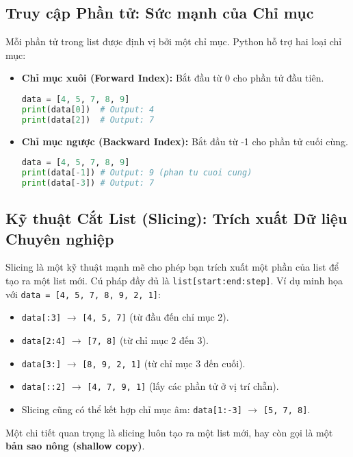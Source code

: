 \documentclass[11pt]{article}
\begin{document}
\subsection{Truy cập Phần tử: Sức mạnh của Chỉ mục}
Mỗi phần tử trong list được định vị bởi một chỉ mục. Python hỗ trợ hai loại chỉ mục:
\begin{itemize}
    \item \textbf{Chỉ mục xuôi (Forward Index):} Bắt đầu từ 0 cho phần tử đầu tiên.
    \begin{lstlisting}[language=Python]
data = [4, 5, 7, 8, 9]
print(data[0])  # Output: 4
print(data[2])  # Output: 7
    \end{lstlisting}
    \item \textbf{Chỉ mục ngược (Backward Index):} Bắt đầu từ -1 cho phần tử cuối cùng.
    \begin{lstlisting}[language=Python]
data = [4, 5, 7, 8, 9]
print(data[-1]) # Output: 9 (phan tu cuoi cung)
print(data[-3]) # Output: 7
    \end{lstlisting}
\end{itemize}

\subsection{Kỹ thuật Cắt List (Slicing): Trích xuất Dữ liệu Chuyên nghiệp}
Slicing là một kỹ thuật mạnh mẽ cho phép bạn trích xuất một phần của list để tạo ra một list mới. Cú pháp đầy đủ là \texttt{list[start:end:step]}.
Ví dụ minh họa với \texttt{data = [4, 5, 7, 8, 9, 2, 1]}:
\begin{itemize}
    \item \texttt{data[:3]} $\rightarrow$ \texttt{[4, 5, 7]} (từ đầu đến chỉ mục 2).
    \item \texttt{data[2:4]} $\rightarrow$ \texttt{[7, 8]} (từ chỉ mục 2 đến 3).
    \item \texttt{data[3:]} $\rightarrow$ \texttt{[8, 9, 2, 1]} (từ chỉ mục 3 đến cuối).
    \item \texttt{data[::2]} $\rightarrow$ \texttt{[4, 7, 9, 1]} (lấy các phần tử ở vị trí chẵn).
    \item Slicing cũng có thể kết hợp chỉ mục âm: \texttt{data[1:-3]} $\rightarrow$ \texttt{[5, 7, 8]}.
\end{itemize}
Một chi tiết quan trọng là slicing luôn tạo ra một list mới, hay còn gọi là một \textbf{bản sao nông (shallow copy)}.
\end{document}
